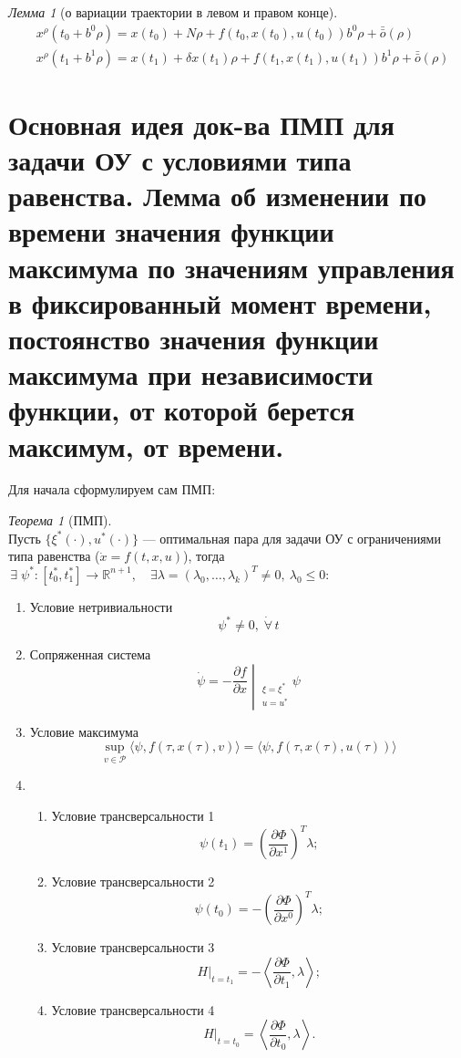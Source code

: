 \documentclass[oneside, final, 14pt, draft]{article}
\theoremstyle{definition}
\theoremstyle{definition}
\theoremstyle{remark}
\theoremstyle{theorem}
\newtheorem{thm}{Теорема}[section]
\newtheorem{lem}{Лемма}[section]
\renewcommand{\leq}{\leqslant}
\begin{document}
\begin{lem}[о вариации траектории в левом и правом конце]\ \\
\begin{align*}
&x^{\rho}(t_0 + b^0\rho) = x(t_0) +N\rho +f(t_0, x(t_0), u(t_0))b^0\rho + \bar{\bar{o}}(\rho)\\
&x^{\rho}(t_1 + b^1\rho) = x(t_1) +\delta x(t_1)  \rho +f(t_1, x(t_1), u(t_1))b^1\rho + \bar{\bar{o}}(\rho)
\end{align*}
\end{lem}

\section{Основная идея док-ва ПМП для задачи ОУ с условиями типа равенства. Лемма об изменении по времени значения функции максимума по значениям управления в фиксированный момент времени, постоянство значения функции максимума при независимости функции, от которой берется максимум, от времени.}
Для начала сформулируем сам ПМП:
\begin{thm}[ПМП]
\ \\
    Пусть $\{ \xi^*(\cdot), u^*(\cdot)\}$ --- оптимальная пара для задачи ОУ с ограничениями типа равенства ($\dot{x} = f(t, x, u)$), тогда 
    $ \,\exists\; \psi^*: \left[t_0^*, t_1^*\right] \rightarrow \mathbb{R}^{n+1}, \quad \exists \lambda = (\lambda_0, \ldots, \lambda_k)^T \neq 0, \ \lambda_0\leq 0$:
    \begin{enumerate}
        \item Условие нетривиальности
        $$\psi^* \neq 0,\; \dot\forall\, t$$
        \item Сопряженная система
        $$
        \dot{\psi} = - \left. \frac{\partial f}{\partial x} \middle|_{\substack{\xi = \xi^*\\ u = u^*}}\psi\right.
        $$
        \item Условие максимума
        $$
        \sup\limits_{v \in \mathcal{P}} \langle \psi, f(\tau, x(\tau), v)\rangle = \langle \psi, f(\tau, x(\tau), u(\tau))\rangle
        $$
        \item 
            \begin{enumerate}
            \item Условие трансверсальности 1
            $$
            \psi(t_1) = \left(\frac{\partial \Phi}{\partial x^1}\right)^T \lambda;
            $$
            \item Условие трансверсальности 2
            $$
            \psi(t_0) = -\left(\frac{\partial \Phi}{\partial x^0}\right)^T \lambda;
            $$
            \item Условие трансверсальности 3
            $$
            \left. H \right|_{t=t_1} = -\left\langle \frac{\partial \Phi}{\partial t_1}, \lambda \right\rangle;
            $$
            \item Условие трансверсальности 4
            $$
            \left. H \right|_{t=t_0} = \left\langle \frac{\partial \Phi}{\partial t_0}, \lambda \right\rangle.
            $$
            \end{enumerate}
    \end{enumerate}
\end{thm}
\end{document}
